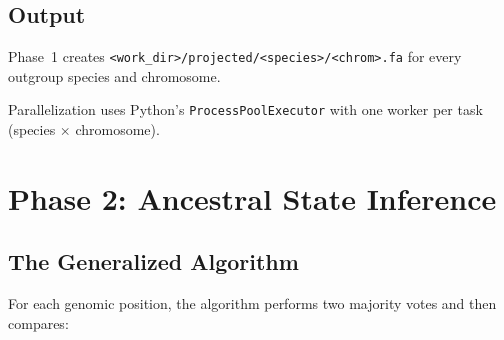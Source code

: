 \documentclass[11pt,a4paper]{article}
\begin{document}
\subsection{Output}

Phase~1 creates \texttt{<work\_dir>/projected/<species>/<chrom>.fa} for every outgroup species and chromosome.

Parallelization uses Python's \texttt{ProcessPoolExecutor} with one worker per task (species $\times$ chromosome).


\section{Phase 2: Ancestral State Inference}
\label{sec:phase2}

\subsection{The Generalized Algorithm}

For each genomic position, the algorithm performs two majority votes and then compares:
\end{document}
